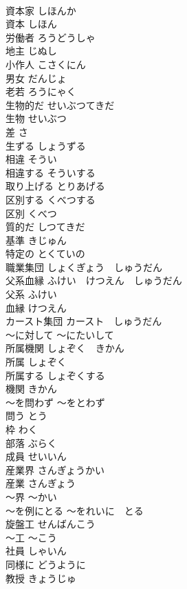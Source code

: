 \documentclass[8pt]{extreport}
\begin{document}
\begin{CJK}{UTF8}{min}
\\	資本家	しほんか	
\\	資本	しほん	
\\	労働者	ろうどうしゃ	
\\	地主	じぬし	
\\	小作人	こさくにん	
\\	男女	だんじょ	
\\	老若	ろうにゃく	
\\	生物的だ	せいぶつてきだ	
\\	生物	せいぶつ	
\\	差	さ	
\\	生ずる	しょうずる	
\\	相違	そうい	
\\	相違する	そういする	
\\	取り上げる	とりあげる	
\\	区別する	くべつする	
\\	区別	くべつ	
\\	質的だ	しつてきだ	
\\	基準	きじゅん	
\\	特定の	とくていの	
\\	職業集団	しょくぎょう　しゅうだん	
\\	父系血縁	ふけい　けつえん　しゅうだん	
\\	父系	ふけい	
\\	血縁	けつえん	
\\	カースト集団	カースト　しゅうだん	
\\	〜に対して	〜にたいして	
\\	所属機関	しょぞく　きかん	
\\	所属	しょぞく	
\\	所属する	しょぞくする	
\\	機関	きかん	
\\	〜を問わず	〜をとわず	
\\	問う	とう	
\\	枠	わく	
\\	部落	ぶらく	
\\	成員	せいいん	
\\	産業界	さんぎょうかい	
\\	産業	さんぎょう	
\\	〜界	〜かい	
\\	〜を例にとる	〜をれいに　とる	
\\	旋盤工	せんばんこう	
\\	〜工	〜こう	
\\	社員	しゃいん	
\\	同様に	どうように	
\\	教授	きょうじゅ	

\end{CJK}
\end{document}
